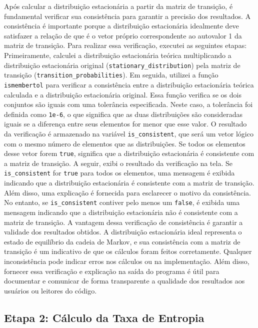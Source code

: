 \documentclass{article}
\begin{document}
\begin{enumerate}
Após calcular a distribuição estacionária a partir da matriz de transição, é fundamental verificar sua consistência para garantir a precisão dos resultados. A consistência é importante porque a distribuição estacionária idealmente deve satisfazer a relação de que é o vetor próprio correspondente ao autovalor 1 da matriz de transição. Para realizar essa verificação, executei as seguintes etapas: Primeiramente, calculei a distribuição estacionária teórica multiplicando a distribuição estacionária original (\texttt{stationary\_distribution}) pela matriz de transição (\texttt{transition\_probabilities}). Em seguida, utilizei a função \texttt{ismembertol} para verificar a consistência entre a distribuição estacionária teórica calculada e a distribuição estacionária original. Essa função verifica se os dois conjuntos são iguais com uma tolerância especificada. Neste caso, a tolerância foi definida como \texttt{1e-6}, o que significa que as duas distribuições são consideradas iguais se a diferença entre seus elementos for menor que esse valor. O resultado da verificação é armazenado na variável \texttt{is\_consistent}, que será um vetor lógico com o mesmo número de elementos que as distribuições. Se todos os elementos desse vetor forem \texttt{true}, significa que a distribuição estacionária é consistente com a matriz de transição. A seguir, exibi o resultado da verificação na tela. Se \texttt{is\_consistent} for \texttt{true} para todos os elementos, uma mensagem é exibida indicando que a distribuição estacionária é consistente com a matriz de transição. Além disso, uma explicação é fornecida para esclarecer o motivo da consistência. No entanto, se \texttt{is\_consistent} contiver pelo menos um \texttt{false}, é exibida uma mensagem indicando que a distribuição estacionária não é consistente com a matriz de transição. A vantagem dessa verificação de consistência é garantir a validade dos resultados obtidos. A distribuição estacionária ideal representa o estado de equilíbrio da cadeia de Markov, e sua consistência com a matriz de transição é um indicativo de que os cálculos foram feitos corretamente. Qualquer inconsistência pode indicar erros nos cálculos ou na implementação. Além disso, fornecer essa verificação e explicação na saída do programa é útil para documentar e comunicar de forma transparente a qualidade dos resultados aos usuários ou leitores do código.
    
\end{enumerate}

\subsection{Etapa 2: Cálculo da Taxa de Entropia}
\end{document}
